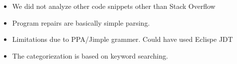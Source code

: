 \begin{itemize}
\item We did not analyze other code snippets other than Stack Overflow
\item Program repairs are basically simple parsing.
\item Limitations due to PPA/Jimple grammer. Could have used Eclispe JDT
\item The categoriezation is based on keyword searching.
\end{itemize}